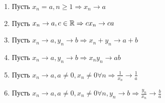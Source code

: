 \documentclass[main]{subfiles}
\begin{document}
\begin{theorem}
    \begin{enumerate}
        \item Пусть $x_n = a, n \geq 1 \Rightarrow x_n \to a$
        \item Пусть $x_n \to a, c \in \mathbb{R} \Rightarrow cx_n \to ca$
        \item Пусть $x_n \to a, y_n \to b \Rightarrow x_n + y_n \to a + b$
        \item Пусть $x_n \to a, y_n \to b \Rightarrow x_ny_n \to ab$
        \item Пусть $x_n \to a, a \neq 0, x_n \neq 0 \forall n \Rightarrow
\frac{1}{x_n} \to \frac{1}{a}$
        \item Пусть $x_n \to a, a \neq 0, x_n \neq 0 \forall n, y_n \to b
\Rightarrow \frac{y_n}{x_n} \to \frac{b}{a}$
    \end{enumerate}
\end{theorem}
\end{document}
